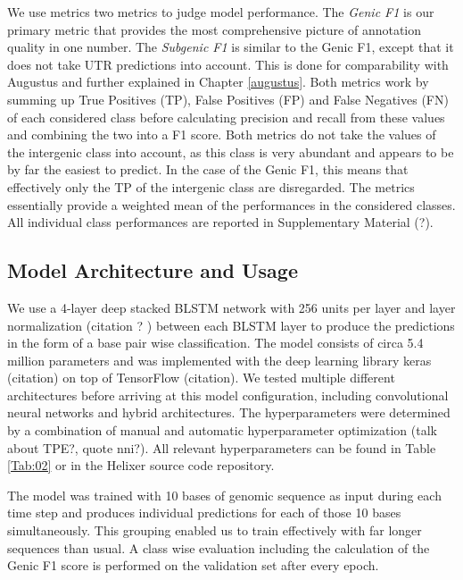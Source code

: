 \documentclass{bioinfo}
\begin{document}
\begin{methods}
We use metrics two metrics to judge model performance. The {\it Genic F1} is our primary metric that provides the most comprehensive picture of annotation quality in one number. The {\it Subgenic F1} is similar to the Genic F1, except that it does not take UTR predictions into account. This is done for comparability with Augustus and further explained in Chapter \ref{augustus}. Both metrics work by summing up True Positives (TP), False Positives (FP) and False Negatives (FN) of each considered class before calculating precision and recall from these values and combining the two into a F1 score. Both metrics do not take the values of the intergenic class into account, as this class is very abundant and appears to be by far the easiest to predict. In the case of the Genic F1, this means that effectively only the TP of the intergenic class are disregarded. The metrics essentially provide a weighted mean of the performances in the considered classes. All individual class performances are reported in Supplementary Material (?). 
	
\subsection{Model Architecture and Usage}
We use a 4-layer deep stacked BLSTM network with 256 units per layer and layer normalization (citation ? ) between each BLSTM layer to produce the predictions in the form of a base pair wise classification. The model consists of circa 5.4 million parameters and was implemented with the deep learning library keras (citation) on top of TensorFlow (citation). We tested multiple different architectures before arriving at this model configuration, including convolutional neural networks and hybrid architectures. The hyperparameters were determined by a combination of manual and automatic hyperparameter optimization (talk about TPE?, quote nni?). All relevant hyperparameters can be found in Table \ref{Tab:02} or in the Helixer source code repository. 
	
The model was trained with 10 bases of genomic sequence as input during each time step and produces individual predictions for each of those 10 bases simultaneously. This grouping enabled us to train effectively with far longer sequences than usual. A class wise evaluation including the calculation of the Genic F1 score is performed on the validation set after every epoch.


\end{methods}
\end{document}

